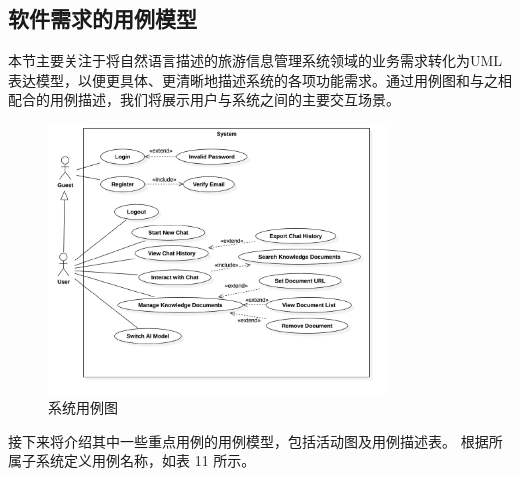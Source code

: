\documentclass[
    report,     %
    oneside,    %
    UTF8,       %
    zihao=-4    %
]{config} %
\begin{document}
\subsection{软件需求的用例模型}
本节主要关注于将自然语言描述的旅游信息管理系统领域的业务需求转化为UML 表达模型，以便更具体、更清晰地描述系统的各项功能需求。通过用例图和与之相配合的用例描述，我们将展示用户与系统之间的主要交互场景。
\begin{figure}[h] %
    \centering %
    \includegraphics[width=0.8\textwidth]{figures/UseCaseDiagram.pdf}
    \caption{系统用例图} %
    \label{fig:UseCaseDiagram} %
\end{figure}
接下来将介绍其中一些重点用例的用例模型，包括活动图及用例描述表。
根据所属子系统定义用例名称，如表 11 所示。
\end{document}
